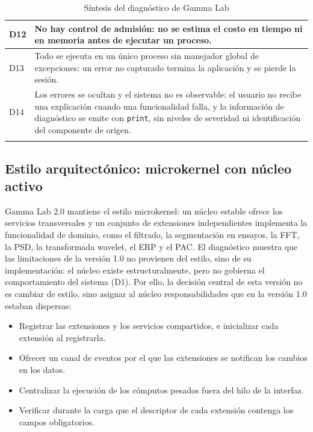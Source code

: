 \documentclass[11pt,a4paper]{article}
\DeclareRobustCommand{\_}{\textunderscore\allowbreak}
\begin{document}
\begin{center}
\begin{longtable}{|>{\raggedright\arraybackslash}p{}|>{\raggedright\arraybackslash}p{}|}
\hline
D12 & No hay control de admisión: no se estima el costo en tiempo ni en memoria antes de ejecutar un proceso.  \\
\hline
D13 & Todo se ejecuta en un único proceso sin manejador global de excepciones: un error no capturado termina la aplicación y se pierde la sesión.  \\
\hline
D14 & Los errores se ocultan y el sistema no es observable: el usuario no recibe una explicación cuando una funcionalidad falla, y la información de diagnóstico se emite con \texttt{print}, sin niveles de severidad ni identificación del componente de origen.  \\
\hline
\caption{Síntesis del diagnóstico de Gamma Lab} \label{tab:sintesis_diagnostico} \\
\end{longtable}
\end{center}


\subsection{Estilo arquitectónico: microkernel con núcleo activo}

Gamma Lab 2.0 mantiene el estilo microkernel: un núcleo estable ofrece los servicios transversales y un conjunto de extensiones independientes implementa la funcionalidad de dominio, como el filtrado, la segmentación en ensayos, la FFT, la PSD, la transformada wavelet, el ERP y el PAC. El diagnóstico muestra que las limitaciones de la versión 1.0 no provienen del estilo, sino de su implementación: el núcleo existe estructuralmente, pero no gobierna el comportamiento del sistema (D1). Por ello, la decisión central de esta versión no es cambiar de estilo, sino asignar al núcleo responsabilidades que en la versión 1.0 estaban dispersas:

\begin{itemize}
    \item Registrar las extensiones y los servicios compartidos, e inicializar cada extensión al registrarla.
    \item Ofrecer un canal de eventos por el que las extensiones se notifican los cambios en los datos.
    \item Centralizar la ejecución de los cómputos pesados fuera del hilo de la interfaz.
    \item Verificar durante la carga que el descriptor de cada extensión contenga los campos obligatorios.
\end{itemize}
\end{document}
